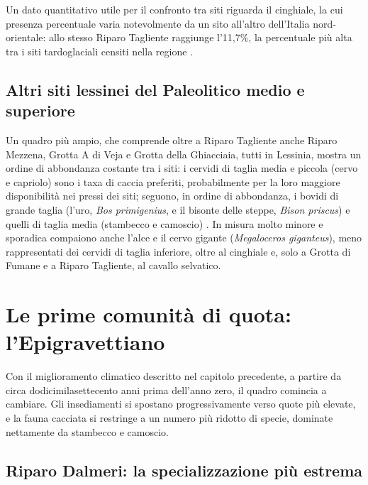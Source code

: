 Un dato quantitativo utile per il confronto tra siti riguarda il cinghiale, la cui presenza percentuale varia notevolmente da un sito all'altro dell'Italia nord-orientale: allo stesso Riparo Tagliente raggiunge l'11,7\%, la percentuale più alta tra i siti tardoglaciali censiti nella regione \citep{fioreetal2003}.

\subsection{Altri siti lessinei del Paleolitico medio e superiore}

Un quadro più ampio, che comprende oltre a Riparo Tagliente anche Riparo Mezzena, Grotta A di Veja e Grotta della Ghiacciaia, tutti in Lessinia, mostra un ordine di abbondanza costante tra i siti: i cervidi di taglia media e piccola (cervo e capriolo) sono i taxa di caccia preferiti, probabilmente per la loro maggiore disponibilità nei pressi dei siti; seguono, in ordine di abbondanza, i bovidi di grande taglia (l'uro, \textit{Bos primigenius}, e il bisonte delle steppe, \textit{Bison priscus}) e quelli di taglia media (stambecco e camoscio) \citep{peresani2017ghiacciaia}. In misura molto minore e sporadica compaiono anche l'alce e il cervo gigante (\textit{Megaloceros giganteus}), meno rappresentati dei cervidi di taglia inferiore, oltre al cinghiale e, solo a Grotta di Fumane e a Riparo Tagliente, al cavallo selvatico.

\section{Le prime comunità di quota: l'Epigravettiano}

Con il miglioramento climatico descritto nel capitolo precedente, a partire da circa dodicimilasettecento anni prima dell'anno zero, il quadro comincia a cambiare. Gli insediamenti si spostano progressivamente verso quote più elevate, e la fauna cacciata si restringe a un numero più ridotto di specie, dominate nettamente da stambecco e camoscio.

\subsection{Riparo Dalmeri: la specializzazione più estrema}


